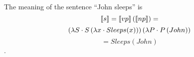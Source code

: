 The meaning of the sentence ``John sleeps'' is $$\sem{s} = \app{\sem{vp}}{\sem{np}} =$$ $$ \appH{\lambdaf{S}{\app{S}{\lambdaf{x}{Sleeps(x)}}}}{\lambdaf{P}{\app{P}{John}}}$$ $$= Sleeps(John)$$.




